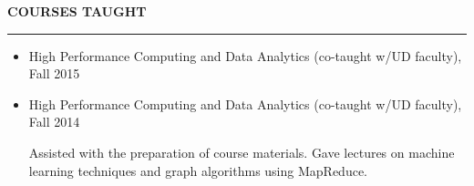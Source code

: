 \documentclass{article}
\begin{document}
\vspace{.25 in}

\noindent \LARGE \textbf{COURSES TAUGHT} \normalsize

\noindent \rule{\textwidth}{1px}

	 \begin{itemize}
	 \item High Performance Computing and Data Analytics (co-taught w/UD faculty), Fall 2015
	 \item High Performance Computing and Data Analytics (co-taught w/UD faculty), Fall 2014

	 Assisted with the preparation of course materials.
	 Gave lectures on machine learning techniques and graph algorithms using MapReduce.
	 \end{itemize}

\end{document}
